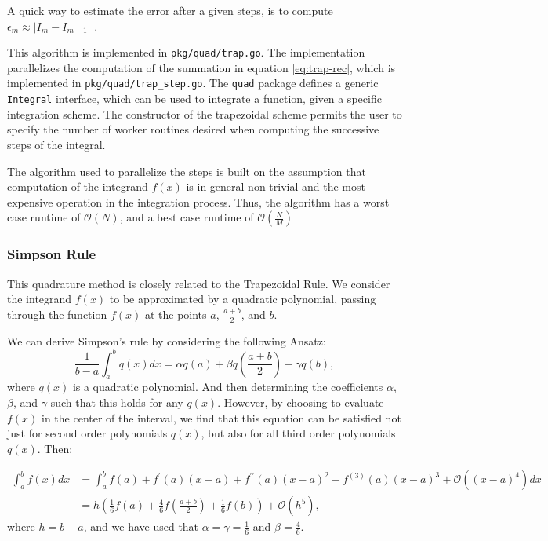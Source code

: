 \documentclass[10pt, a4paper]{article}
\begin{document}
  A quick way to estimate the error after a given steps, is to compute $\epsilon_m \approx |I_m - I_{m-1}|$
  \cite{nr}.

  This algorithm is implemented in \texttt{pkg/quad/trap.go}. The implementation parallelizes the computation
  of the summation in equation \ref{eq:trap-rec}, which is implemented in \texttt{pkg/quad/trap\_step.go}.
  The \texttt{quad} package defines a generic \texttt{Integral} interface, which can be used to integrate
  a function, given a specific integration scheme. The constructor of the trapezoidal scheme permits the
  user to specify the number of worker routines desired when computing the successive steps of the integral.

  The algorithm used to parallelize the steps is built on the assumption that computation of the integrand
  $f(x)$ is in general non-trivial and the most expensive operation in the integration process. Thus, the
  algorithm has a worst case runtime of $\mathcal{O}(N)$, and a best case runtime of $\mathcal{O}(\frac{N}{M})$

  \subsubsection{Simpson Rule}
  This quadrature method is closely related to the Trapezoidal Rule\footnotemark. We consider the integrand
  $f(x)$ to be approximated by a quadratic polynomial, passing through the function $f(x)$ at the points
  $a$, $\frac{a+b}{2}$, and $b$.


  We can derive Simpson's rule by considering the following Ansatz:
  \begin{equation}
  \frac{1}{b-a} \int_a^b q(x) dx = \alpha q(a) + \beta q(\frac{a+b}{2}) + \gamma q(b),
  \end{equation}
  where $q(x)$ is a quadratic polynomial. And then determining the coefficients $\alpha$, $\beta$, and $\gamma$
  such that this holds for any $q(x)$. However, by choosing to evaluate $f(x)$ in the center of the interval,
  we find that this equation can be satisfied not just for second order polynomials $q(x)$, but also
  for all third order polynomials $q(x)$. Then:

  \begin{equation}
  \begin{split}
  \int_a^b f(x) dx &= \int_a^b f(a) + f^\prime(a) (x-a) + f^{\prime\prime}(a) (x-a)^2 + f^{(3)}(a) (x-a)^3 + \mathcal{O}\left((x-a)^4\right) dx \\
  &= h \left( \frac{1}{6} f(a) + \frac{4}{6} f(\frac{a+b}{2}) + \frac{1}{6} f(b) \right) + \mathcal{O}(h^5),
  \end{split}
  \end{equation}
  where $h = b-a$, and we have used that $\alpha = \gamma = \frac{1}{6}$ and $\beta = \frac{4}{6}$.
\end{document}
